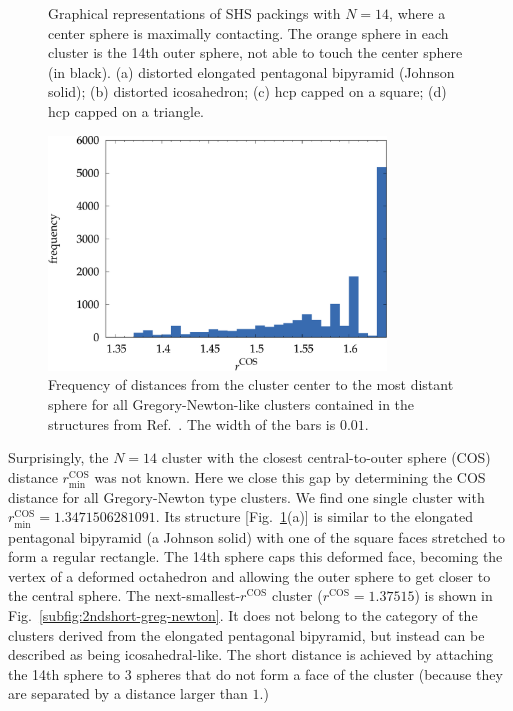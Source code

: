 \begin{figure}
    \caption{Graphical representations of SHS packings with $N=14$, where a
    center sphere is maximally contacting. The orange sphere in each
    cluster is the 14th outer sphere, not able to touch the center sphere (in black).
    (a) distorted elongated pentagonal bipyramid (Johnson solid); (b) distorted icosahedron; (c) hcp capped on a square; (d) hcp capped on a triangle.}
    \label{fig:N14}
\end{figure}

\begin{figure}
    \centering
    \includegraphics[width=0.8\textwidth]{gregory-newton/greg-newton.pdf}
    \caption{Frequency of distances from the cluster center to the most distant
    sphere for all Gregory-Newton-like clusters contained in the structures
    from Ref.~\cite{holmes-cerfon_enumerating_2016}. The width of the bars is $0.01$.}
    \label{fig:greg-newton}
\end{figure}


Surprisingly, the $N = 14$ cluster with the closest central-to-outer sphere
(COS) distance $r_\text{min}^\text{COS}$ was not known. Here we close this gap by
determining the COS distance for all Gregory-Newton type clusters.  We find one
single cluster with $r_\text{min}^\text{COS}=1.3471506281091$.  Its structure
[Fig.\ \ref{fig:N14}(a)] is similar to the elongated pentagonal bipyramid (a
Johnson solid) with one of the square faces stretched to form a regular
rectangle.  The 14th sphere caps this deformed face, becoming the vertex of a
deformed octahedron and allowing the outer sphere to get closer to the central
sphere.  The next-smallest-$r^\text{COS}$ cluster ($r^\text{COS} = 1.37515$) is
shown in Fig.~\ref{subfig:2ndshort-greg-newton}.  It does not belong to the
category of the clusters derived from the elongated pentagonal bipyramid, but
instead can be described as being icosahedral-like.  The short distance is
achieved by attaching the 14th sphere to 3 spheres that do not form a face of
the cluster (because they are separated by a distance larger than $1$.)


